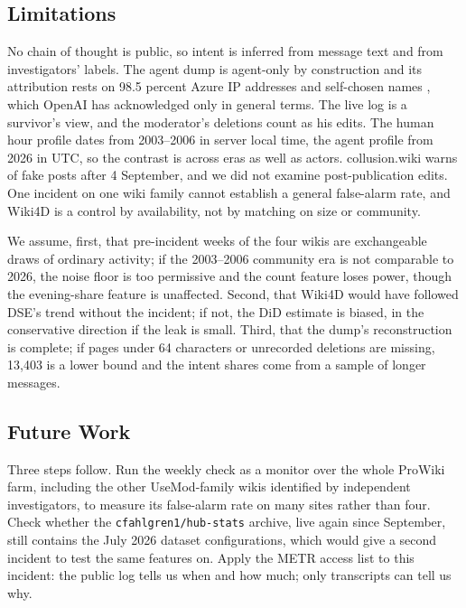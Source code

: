 \documentclass[10pt,a4paper]{article}
\begin{document}
\subsection*{Limitations}

No chain of thought is public, so intent is inferred from message text and from investigators' labels. The agent dump is agent-only by construction and its attribution rests on 98.5 percent Azure IP addresses and self-chosen names \citep{collusionwiki2026}, which OpenAI has acknowledged only in general terms. The live log is a survivor's view, and the moderator's deletions count as his edits. The human hour profile dates from 2003--2006 in server local time, the agent profile from 2026 in UTC, so the contrast is across eras as well as actors. collusion.wiki warns of fake posts after 4 September, and we did not examine post-publication edits. One incident on one wiki family cannot establish a general false-alarm rate, and Wiki4D is a control by availability, not by matching on size or community.

We assume, first, that pre-incident weeks of the four wikis are exchangeable draws of ordinary activity; if the 2003--2006 community era is not comparable to 2026, the noise floor is too permissive and the count feature loses power, though the evening-share feature is unaffected. Second, that Wiki4D would have followed DSE's trend without the incident; if not, the DiD estimate is biased, in the conservative direction if the leak is small. Third, that the dump's reconstruction is complete; if pages under 64 characters or unrecorded deletions are missing, 13,403 is a lower bound and the intent shares come from a sample of longer messages.

\subsection*{Future Work}

Three steps follow. Run the weekly check as a monitor over the whole ProWiki farm, including the other UseMod-family wikis identified by independent investigators, to measure its false-alarm rate on many sites rather than four. Check whether the \texttt{cfahlgren1/hub-stats} archive, live again since September, still contains the July 2026 dataset configurations, which would give a second incident to test the same features on. Apply the METR access list \citep{HowIndependentResearchers2026} to this incident: the public log tells us when and how much; only transcripts can tell us why.
\end{document}
